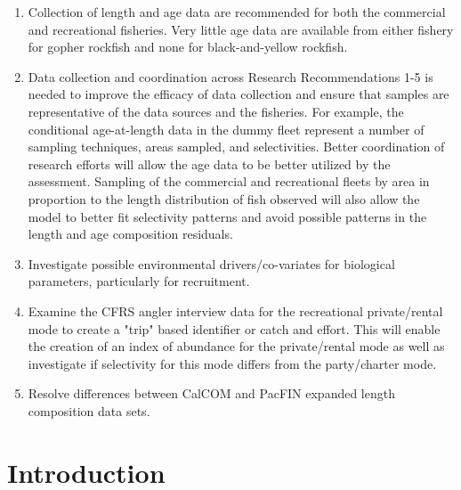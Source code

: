 \documentclass[12pt,]{article}
\begin{document}
\begin{enumerate}
\item Collection of length and age data are recommended for both the commercial and 
recreational fisheries.  Very little age data are available from either fishery for 
gopher rockfish and none for black-and-yellow rockfish.

\item Data collection and coordination across Research Recommendations 1-5 is needed to improve 
the efficacy of data collection and ensure that samples are representative of the 
data sources and the fisheries.  For example, the conditional age-at-length data in 
the dummy fleet represent a number of sampling techniques, areas sampled, and 
selectivities.  Better coordination of research efforts will allow the age data 
to be better utilized by the assessment.  Sampling of the commercial and recreational 
fleets by area in proportion to the length distribution of fish observed will also 
allow the model to better fit selectivity patterns and avoid possible patterns in the 
length and age composition residuals.

\item Investigate possible environmental drivers/co-variates for biological parameters, 
particularly for recruitment.

\item Examine the CFRS angler interview data for the recreational private/rental mode 
to create a "trip" based identifier or catch and effort. This will enable the creation 
of an index of abundance for the private/rental mode as well as investigate if 
selectivity for this mode differs from the party/charter mode.

\item Resolve differences between CalCOM and PacFIN expanded length composition data sets. 


\end{enumerate}

\FloatBarrier

\newpage

\renewcommand{\thefigure}{\arabic{figure}}
\renewcommand{\thetable}{\arabic{table}}

\setcounter{figure}{0} \setcounter{table}{0}


\section{Introduction}\label{introduction}
\end{document}
